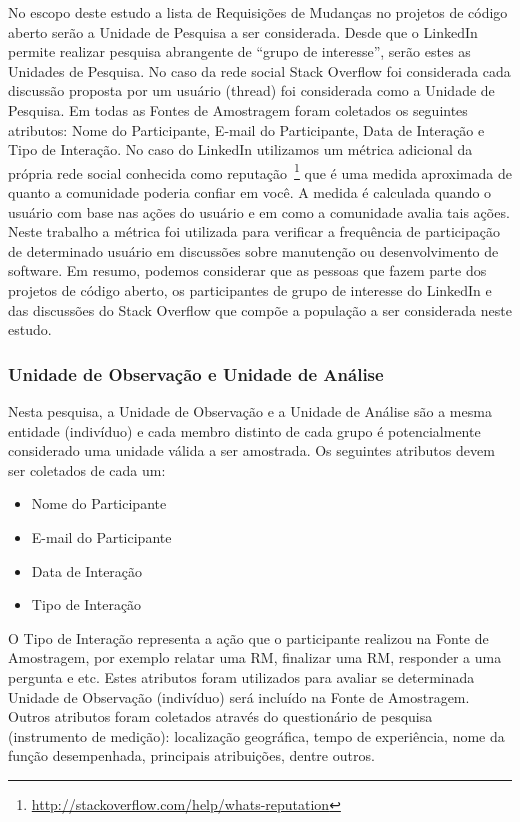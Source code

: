 No escopo deste estudo a lista de Requisições de Mudanças no projetos de código
aberto serão a Unidade de Pesquisa a ser considerada. Desde que o LinkedIn
permite realizar pesquisa abrangente de ``grupo de interesse'', serão estes as
Unidades de Pesquisa. No caso da rede social Stack Overflow foi considerada cada
discussão proposta por um usuário (thread) foi considerada como a Unidade de
Pesquisa. Em todas as Fontes de Amostragem foram coletados os seguintes
atributos: Nome do Participante, E-mail do Participante, Data de Interação e
Tipo de Interação. No caso do LinkedIn utilizamos um métrica
adicional da própria rede social conhecida como
reputação~\footnote{\url{http://stackoverflow.com/help/whats-reputation}} que é
uma medida aproximada de quanto a comunidade poderia confiar em você. A medida é
calculada quando o usuário com base nas ações do usuário e em como a comunidade
avalia tais ações. Neste trabalho a métrica foi utilizada para verificar a
frequência de participação de determinado usuário em discussões sobre manutenção
ou desenvolvimento de software. Em resumo, podemos considerar que as pessoas que
fazem parte dos projetos de código aberto, os participantes de grupo de
interesse do LinkedIn e das discussões do Stack Overflow  que compõe a população
a ser considerada neste estudo.

\subsubsection{Unidade de Observação e Unidade de Análise}

Nesta pesquisa, a Unidade de Observação e a Unidade de Análise são a mesma
entidade (indivíduo) e cada membro distinto de cada grupo é potencialmente
considerado uma unidade válida a ser amostrada. Os seguintes atributos devem ser
coletados de cada um:
\begin{itemize}
	\item Nome do Participante
	\item E-mail do Participante
	\item Data de Interação
	\item Tipo de Interação
\end{itemize}

O Tipo de Interação representa a ação que o participante realizou na Fonte de
Amostragem, por exemplo relatar uma RM, finalizar uma RM, responder a uma
pergunta e etc. Estes atributos foram utilizados para avaliar se determinada
Unidade de Observação (indivíduo) será incluído na Fonte de Amostragem. Outros
atributos foram coletados através do questionário de pesquisa (instrumento de
medição): localização geográfica, tempo de experiência, nome da função
desempenhada, principais atribuições, dentre outros.

